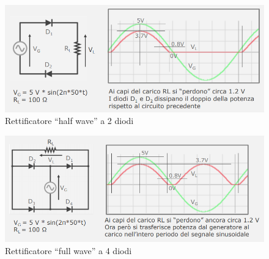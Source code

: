 \documentclass{article}
\begin{document}
\begin{figure}[h]
  \centering
  \includegraphics[scale=0.6]{IM_rettificatore_half_wave_2}
  \caption{Rettificatore ``half wave'' a 2 diodi}
  \label{Schema_rettificatore_half_wave_2}
\end{figure}

\begin{figure}[h]
  \centering
  \includegraphics[scale=0.6]{IM_rettificatore_full_wave}
  \caption{Rettificatore ``full wave'' a 4 diodi}
  \label{Schema_rettificatore_full_wave}
\end{figure}
\end{document}
